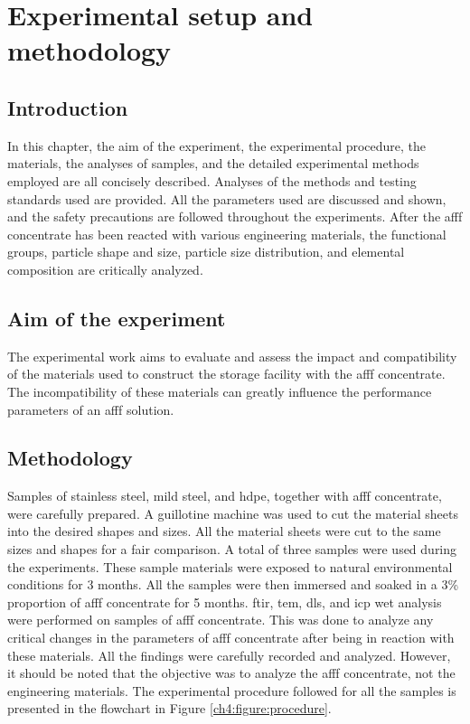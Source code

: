 \chapter{Experimental setup and methodology}
\label{ch4:anchor:chapter}

\section{Introduction}
In this chapter, the aim of the experiment, the experimental procedure, the materials, the analyses of samples, and the detailed experimental methods employed are all concisely described. Analyses of the methods and testing standards used are provided. All the parameters used are discussed and shown, and the safety precautions are followed throughout the experiments. After the \acrshort{afff} concentrate has been reacted with various engineering materials, the functional groups, particle shape and size, particle size distribution, and elemental composition are critically analyzed.

\section{Aim of the experiment}
The experimental work aims to evaluate and assess the impact and compatibility of the materials used to construct the storage facility with the \acrshort{afff} concentrate. The incompatibility of these materials can greatly influence the performance parameters of an \acrshort{afff} solution.  

\section{Methodology}
Samples of stainless steel, mild steel, and \acrshort{hdpe}, together with \acrshort{afff} concentrate, were carefully prepared. A guillotine machine was used to cut the material sheets into the desired shapes and sizes. All the material sheets were cut to the same sizes and shapes for a fair comparison. A total of three samples were used during the experiments. These sample materials were exposed to natural environmental conditions for 3 months. All the samples were then immersed and soaked in a 3\% proportion of \acrshort{afff} concentrate for 5 months. \Acrfull{ftir}, \acrfull{tem}, \acrfull{dls}, and \acrfull{icp} wet analysis were performed on samples of \acrshort{afff} concentrate. This was done to analyze any critical changes in the parameters of \acrshort{afff} concentrate after being in reaction with these materials. All the findings were carefully recorded and analyzed. However, it should be noted that the objective was to analyze the \acrshort{afff} concentrate, not the engineering materials. The experimental procedure followed for all the samples is presented in the flowchart in Figure \ref{ch4:figure:procedure}. 

